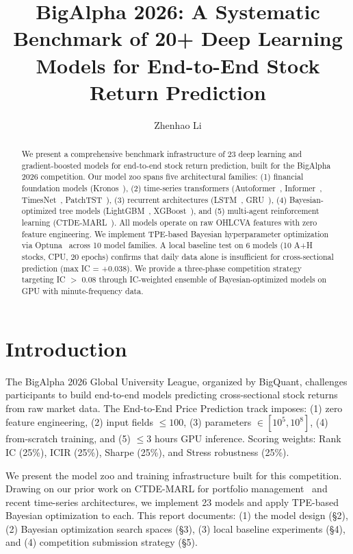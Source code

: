 \documentclass[sigconf,10pt]{acmart}
\title{BigAlpha 2026: A Systematic Benchmark of 20+ Deep Learning Models for End-to-End Stock Return Prediction}
\author{Zhenhao Li}
\affiliation{%
  \institution{XJTLU / University of Liverpool}
  \city{Suzhou}
  \country{China}
}
\begin{document}
\begin{abstract}
We present a comprehensive benchmark infrastructure of 23 deep learning and gradient-boosted models for end-to-end stock return prediction, built for the BigAlpha 2026 competition. Our model zoo spans five architectural families: (1) financial foundation models (Kronos~\cite{kronos2025}), (2) time-series transformers (Autoformer~\cite{wu2021autoformer}, Informer~\cite{zhou2021informer}, TimesNet~\cite{wu2023timesnet}, PatchTST~\cite{nie2023patchtst}), (3) recurrent architectures (LSTM~\cite{hochreiter1997long}, GRU~\cite{cho2014learning}), (4) Bayesian-optimized tree models (LightGBM~\cite{ke2017lightgbm}, XGBoost~\cite{chen2016xgboost}), and (5) multi-agent reinforcement learning (CTDE-MARL~\cite{ctde2026acml}). All models operate on raw OHLCVA features with zero feature engineering. We implement TPE-based Bayesian hyperparameter optimization~\cite{bergstra2011algorithms,snoek2012practical} via Optuna~\cite{akiba2019optuna} across 10 model families. A local baseline test on 6 models (10 A+H stocks, CPU, 20 epochs) confirms that daily data alone is insufficient for cross-sectional prediction (max IC = +0.038). We provide a three-phase competition strategy targeting IC $>$ 0.08 through IC-weighted ensemble of Bayesian-optimized models on GPU with minute-frequency data.
\end{abstract}

\maketitle

\section{Introduction}

The BigAlpha 2026 Global University League, organized by BigQuant, challenges participants to build end-to-end models predicting cross-sectional stock returns from raw market data. The End-to-End Price Prediction track imposes: (1) zero feature engineering, (2) input fields $\le 100$, (3) parameters $\in [10^5, 10^8]$, (4) from-scratch training, and (5) $\le 3$ hours GPU inference. Scoring weights: Rank IC (25\%), ICIR (25\%), Sharpe (25\%), and Stress robustness (25\%).

We present the model zoo and training infrastructure built for this competition. Drawing on our prior work on CTDE-MARL for portfolio management~\cite{ctde2026acml} and recent time-series architectures, we implement 23 models and apply TPE-based Bayesian optimization to each. This report documents: (1) the model design (§2), (2) Bayesian optimization search spaces (§3), (3) local baseline experiments (§4), and (4) competition submission strategy (§5).
\end{document}
